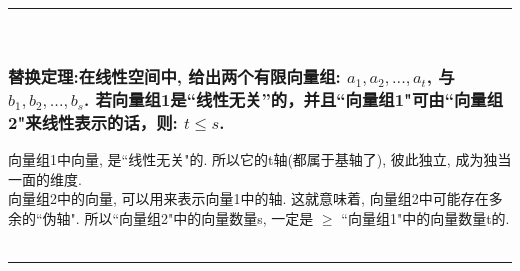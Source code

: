 \documentclass[UTF8]{ctexart}
\begin{document}
~\\
\hrule
~\\

\subsubsection{替换定理:在线性空间中, 给出两个有限向量组: $a_1, a_2, ..., a_t$, 与 $b_1, b_2, ..., b_s$. 若向量组1是``线性无关''的，并且``向量组1"可由``向量组2"来线性表示的话，则:  $t \leq s$. }


向量组1中向量, 是``线性无关"的. 所以它的t轴(都属于基轴了), 彼此独立, 成为独当一面的维度. \\
向量组2中的向量, 可以用来表示向量1中的轴. 这就意味着, 向量组2中可能存在多余的``伪轴". 所以``向量组2"中的向量数量s, 一定是 $\geq$ ``向量组1"中的向量数量t的. \\



~\\
\hrule
~\\
\end{document}
